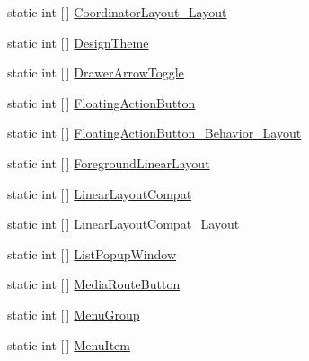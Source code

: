 \begin{DoxyCompactItemize}
\item 
static int \mbox{[}$\,$\mbox{]} \mbox{\hyperlink{class_f_w_p_s___app_1_1_droid_1_1_resource_1_1_styleable_ac2798a82cd92726ea41801c917c0faa7}{Coordinator\+Layout\+\_\+\+Layout}}
\item 
static int \mbox{[}$\,$\mbox{]} \mbox{\hyperlink{class_f_w_p_s___app_1_1_droid_1_1_resource_1_1_styleable_a53c44927b0599cf73711d8ff684e28b5}{Design\+Theme}}
\item 
static int \mbox{[}$\,$\mbox{]} \mbox{\hyperlink{class_f_w_p_s___app_1_1_droid_1_1_resource_1_1_styleable_a3b63bf391f67d875e0d3c308e10a3212}{Drawer\+Arrow\+Toggle}}
\item 
static int \mbox{[}$\,$\mbox{]} \mbox{\hyperlink{class_f_w_p_s___app_1_1_droid_1_1_resource_1_1_styleable_a9ff3976e034ffcc12f202c9fd9533f9c}{Floating\+Action\+Button}}
\item 
static int \mbox{[}$\,$\mbox{]} \mbox{\hyperlink{class_f_w_p_s___app_1_1_droid_1_1_resource_1_1_styleable_aefa671d9675c881a3a91a5d8dd636d2f}{Floating\+Action\+Button\+\_\+\+Behavior\+\_\+\+Layout}}
\item 
static int \mbox{[}$\,$\mbox{]} \mbox{\hyperlink{class_f_w_p_s___app_1_1_droid_1_1_resource_1_1_styleable_a3c76fc824e9b23b0ad19c31ff1b5fc87}{Foreground\+Linear\+Layout}}
\item 
static int \mbox{[}$\,$\mbox{]} \mbox{\hyperlink{class_f_w_p_s___app_1_1_droid_1_1_resource_1_1_styleable_ab8abf10aa782af5003cdc8c8106b7611}{Linear\+Layout\+Compat}}
\item 
static int \mbox{[}$\,$\mbox{]} \mbox{\hyperlink{class_f_w_p_s___app_1_1_droid_1_1_resource_1_1_styleable_ae0603582fd02fc53888ba4d0d5d73e84}{Linear\+Layout\+Compat\+\_\+\+Layout}}
\item 
static int \mbox{[}$\,$\mbox{]} \mbox{\hyperlink{class_f_w_p_s___app_1_1_droid_1_1_resource_1_1_styleable_ac2605b4412d9bcaa1fe0e674005f136f}{List\+Popup\+Window}}
\item 
static int \mbox{[}$\,$\mbox{]} \mbox{\hyperlink{class_f_w_p_s___app_1_1_droid_1_1_resource_1_1_styleable_a8cafd7fabe3297dcbf7ae41a8292683c}{Media\+Route\+Button}}
\item 
static int \mbox{[}$\,$\mbox{]} \mbox{\hyperlink{class_f_w_p_s___app_1_1_droid_1_1_resource_1_1_styleable_ad5ed0c6034f962c63afbf840ab515017}{Menu\+Group}}
\item 
static int \mbox{[}$\,$\mbox{]} \mbox{\hyperlink{class_f_w_p_s___app_1_1_droid_1_1_resource_1_1_styleable_a9d28dea4148c737498cad891e1967b13}{Menu\+Item}}
\item 

\end{DoxyCompactItemize}
